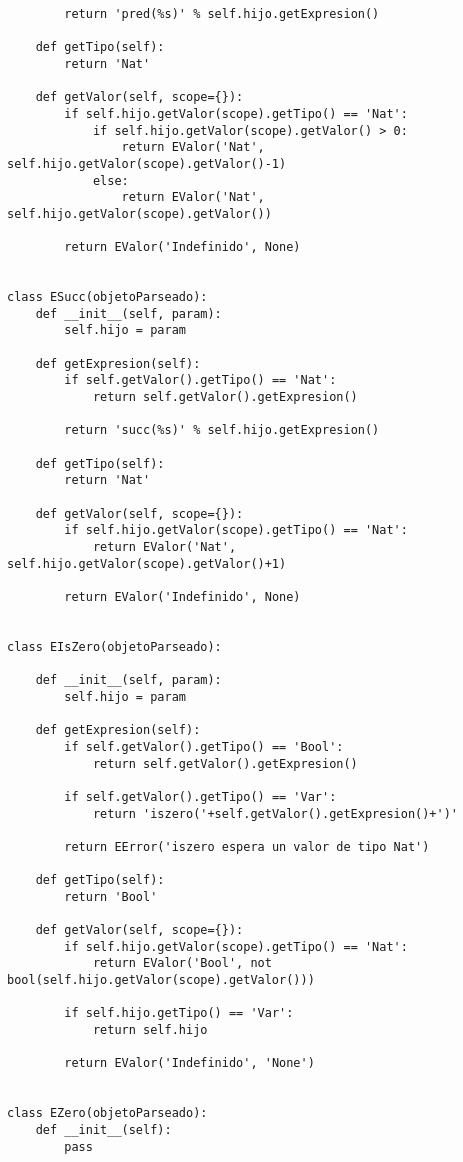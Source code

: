 \begin{verbatim}
        return 'pred(%s)' % self.hijo.getExpresion()
    
    def getTipo(self):
        return 'Nat'

    def getValor(self, scope={}):
        if self.hijo.getValor(scope).getTipo() == 'Nat':
            if self.hijo.getValor(scope).getValor() > 0:
                return EValor('Nat', self.hijo.getValor(scope).getValor()-1)
            else:
                return EValor('Nat', self.hijo.getValor(scope).getValor())

        return EValor('Indefinido', None)


class ESucc(objetoParseado):
    def __init__(self, param):
        self.hijo = param

    def getExpresion(self):
        if self.getValor().getTipo() == 'Nat':
            return self.getValor().getExpresion()        
        
        return 'succ(%s)' % self.hijo.getExpresion()
    
    def getTipo(self):
        return 'Nat'

    def getValor(self, scope={}):                 
        if self.hijo.getValor(scope).getTipo() == 'Nat':
            return EValor('Nat', self.hijo.getValor(scope).getValor()+1)
        
        return EValor('Indefinido', None)


class EIsZero(objetoParseado):
    
    def __init__(self, param):
        self.hijo = param        
        
    def getExpresion(self):
        if self.getValor().getTipo() == 'Bool':
            return self.getValor().getExpresion()

        if self.getValor().getTipo() == 'Var':
            return 'iszero('+self.getValor().getExpresion()+')'

        return EError('iszero espera un valor de tipo Nat')
    
    def getTipo(self):
        return 'Bool'

    def getValor(self, scope={}):
        if self.hijo.getValor(scope).getTipo() == 'Nat':
            return EValor('Bool', not bool(self.hijo.getValor(scope).getValor()))        
        
        if self.hijo.getTipo() == 'Var':
            return self.hijo

        return EValor('Indefinido', 'None')


class EZero(objetoParseado):
    def __init__(self):
        pass


\end{verbatim}
